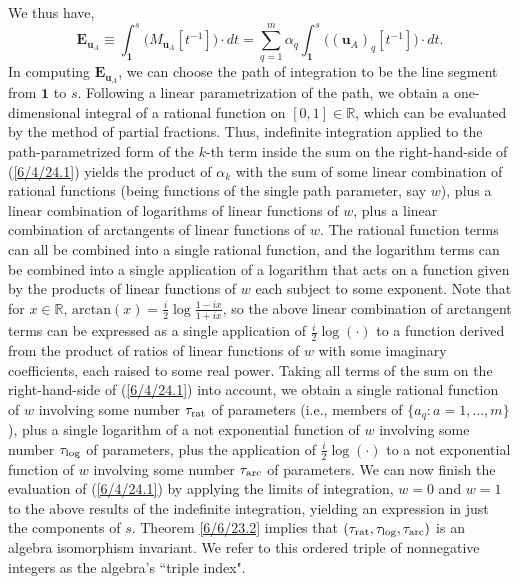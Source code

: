 \documentclass{amsart}
\numberwithin{equation}{section}
\theoremstyle{definition}
\numberwithin{theorem}{section}
\begin{document}
We thus have, \begin{equation}\label{6/4/24.1} \mathbf{E}_{\mathbf{u}_A} \equiv \int_{\mathbf{1}}^s\big(M_{\mathbf{u}_A}[t^{-1}]\big)\cdot dt = \sum_{q=1}^m\alpha_q\int_{\mathbf{1}}^s  \big((\mathbf{u}_A)_q[t^{-1}]\big) \cdot dt.\end{equation}   In computing $\mathbf{E}_{\mathbf{u}_A}$, we can choose the path of integration to be the line segment from $\mathbf{1}$ to $s$. 
Following a linear parametrization of the path, we obtain a one-dimensional integral of a rational function on $[0,1]\in\mathbb{R}$,
which can be evaluated by the method of partial fractions. 
 Thus, indefinite integration applied to the path-parametrized form of the $k$-th term inside the sum on the right-hand-side of (\ref{6/4/24.1}) yields the product of $\alpha_k$ with  
the sum of some linear combination of rational functions (being functions of the single path parameter, say $w$), plus a linear combination of logarithms of linear functions of $w$, plus a linear combination of arctangents of linear functions of $w$.  The rational function terms can all be combined into a single rational function, and the logarithm terms can be combined into a single application of a logarithm that acts on a function given by the products of linear functions of $w$ each subject to some exponent.  Note that for $x\in\mathbb{R}$, $\mbox{arctan}(x) = \frac{i}{2}\log\frac{1-ix}{1+ix}$, so the above linear combination of arctangent terms can be expressed as a single application of $\frac{i}{2}\log(\cdot)$ to a function derived from the product of ratios of linear functions of $w$ with some imaginary coefficients, each raised to some real power.   Taking all terms of the sum on the right-hand-side of (\ref{6/4/24.1}) into account, we obtain a single rational function of $w$ involving some number $\tau_{\rm rat}$ of parameters (i.e., members of $\{a_q:a=1,\dots,m\}$), plus a single logarithm of a not exponential function of $w$ involving some number $\tau_{\rm log}$ of parameters, plus the application of $\frac{i}{2}\log (\cdot)$ to a not exponential function of $w$ involving some number $\tau_{\rm arc}$ of parameters.  We can now finish the evaluation of (\ref{6/4/24.1}) by applying the limits of integration, $w=0$ and $w=1$ to the above results of the indefinite integration, yielding an expression in just the components of $s$.   Theorem \ref{6/6/23.2} implies that $(\tau_{\rm rat},\tau_{\rm log},\tau_{\rm arc})$ is an algebra isomorphism invariant.  We refer to this ordered triple of nonnegative integers as the algebra's ``triple index".
\end{document}
